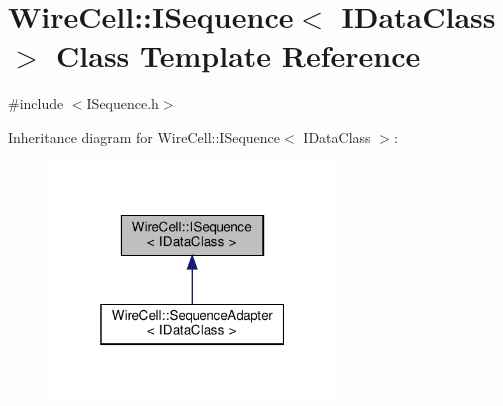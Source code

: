 \hypertarget{class_wire_cell_1_1_i_sequence}{}\section{Wire\+Cell\+:\+:I\+Sequence$<$ I\+Data\+Class $>$ Class Template Reference}
\label{class_wire_cell_1_1_i_sequence}


{\ttfamily \#include $<$I\+Sequence.\+h$>$}



Inheritance diagram for Wire\+Cell\+:\+:I\+Sequence$<$ I\+Data\+Class $>$\+:
\nopagebreak
\begin{figure}[H]
\begin{center}
\leavevmode
\includegraphics[width=217pt]{class_wire_cell_1_1_i_sequence__inherit__graph}
\end{center}
\end{figure}
